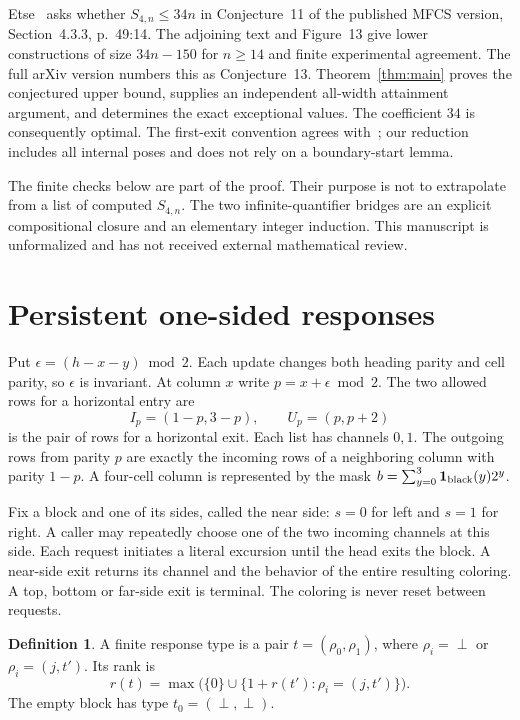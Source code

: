 \documentclass[11pt]{article}
\theoremstyle{definition}\newtheorem{definition}[theorem]{Definition}
\newcommand{\botv}{\perp}
\begin{document}
Etse~\cite{etse} asks whether $S_{4,n}\le34n$ in Conjecture~11 of the published
MFCS version, Section~4.3.3, p.~49:14. The adjoining text and Figure~13 give
lower constructions of size $34n-150$ for $n\ge14$ and finite experimental
agreement. The full arXiv version numbers this as Conjecture~13.
Theorem~\ref{thm:main} proves the conjectured upper bound, supplies an independent
all-width attainment argument, and determines the exact exceptional values.
The coefficient $34$ is consequently optimal. The first-exit convention agrees
with~\cite{etse}; our reduction includes all internal poses and does not rely
on a boundary-start lemma.

The finite checks below are part of the proof. Their purpose is not to extrapolate
from a list of computed $S_{4,n}$. The two infinite-quantifier bridges are an
explicit compositional closure and an elementary integer induction. This
manuscript is unformalized and has not received external mathematical review.

\section{Persistent one-sided responses}
Put $\epsilon=(h-x-y)\bmod2$. Each update changes both heading parity and cell
parity, so $\epsilon$ is invariant. At column $x$ write $p=x+\epsilon\bmod2$.
The two allowed rows for a horizontal entry are
\[
 I_p=(1-p,3-p),\qquad U_p=(p,p+2)
\]
is the pair of rows for a horizontal exit. Each list has channels $0,1$.
The outgoing rows from parity $p$ are exactly the incoming rows of a neighboring
column with parity $1-p$. A four-cell column is represented by the mask
$b=\sum_{y=0}^3\mathbf1_{\rm black}(y)2^y$.

Fix a block and one of its sides, called the near side: $s=0$ for left and $s=1$
for right. A caller may repeatedly choose one of the two incoming channels at
this side. Each request initiates a literal excursion until the head exits the
block. A near-side exit returns its channel and the behavior of the entire
resulting coloring. A top, bottom or far-side exit is terminal. The coloring
is never reset between requests.

\begin{definition}
A finite response type is a pair $t=(\rho_0,\rho_1)$, where
$\rho_i=\botv$ or $\rho_i=(j,t')$. Its rank is
\[
 r(t)=\max\bigl(\{0\}\cup\{1+r(t'): \rho_i=(j,t')\}\bigr).
\]
The empty block has type $t_0=(\botv,\botv)$.
\end{definition}
\end{document}

